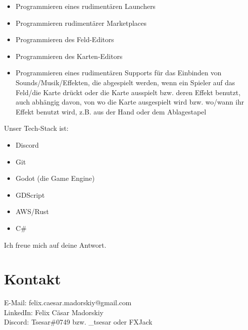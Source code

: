 \documentclass[fontsize=12]{scrartcl}
\begin{document}
	\begin{itemize}
		
		\item Programmieren eines rudimentären Launchers
		
		\item Programmieren rudimentärer Marketplaces
		
		\item Programmieren des Feld-Editors

		\item Programmieren des Karten-Editors
		
		\item Programmieren eines rudimentären Supports für das Einbinden von Sounds/Musik/Effekten, die abgespielt werden, wenn ein Spieler auf das Feld/die Karte drückt oder die Karte ausspielt bzw. deren Effekt benutzt, auch abhängig davon, von wo die Karte ausgespielt wird bzw. wo/wann ihr Effekt benutzt wird, z.B. aus der Hand oder dem Ablagestapel
		
	\end{itemize}
	
	\noindent Unser Tech-Stack ist:
	
	\begin{itemize}
		
		\item Discord
		
		\item Git
		
		\item Godot (die Game Engine)
		
		\item GDScript
		
		\item AWS/Rust
		
		\item C\#
		
	\end{itemize}
	
	\noindent Ich freue mich auf deine Antwort.
	
	\section{Kontakt}
	
	E-Mail: felix.caesar.madorskiy@gmail.com\\
	LinkedIn: Felix Cäsar Madorskiy\\
	Discord: Tsesar\#0749 bzw. \_tsesar oder FXJack
	
	
	
\end{document}
